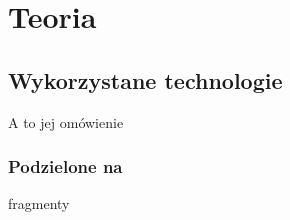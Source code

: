 \chapter{Teoria}

\section{Wykorzystane technologie}

A to jej omówienie

\subsection{Podzielone na}

fragmenty



